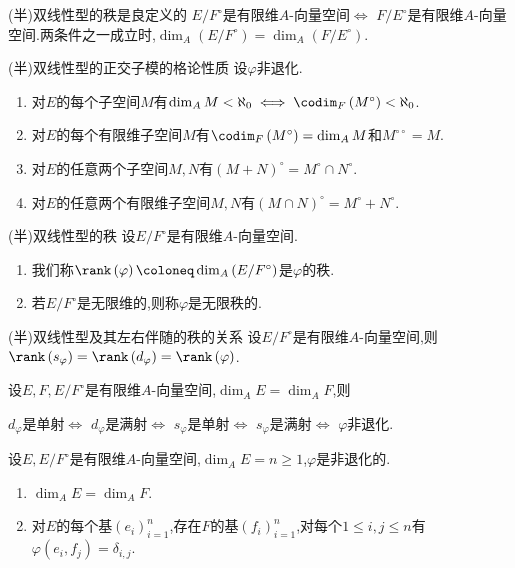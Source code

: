\begin{proposition}{(半)双线性型的秩是良定义的}{}
	$E/F^{\circ}$是有限维$A$-向量空间$\iff$ $F/E^{\circ}$是有限维$A$-向量空间.两条件之一成立时,$\dim_{A}\left(E/F^{\circ}\right)=\dim_{A}\left(F/E^{\circ}\right)$.
\end{proposition}

\begin{corollary}{(半)双线性型的正交子模的格论性质}{}
	设$\varphi$非退化.
	\begin{enumerate}
		\item 对$E$的每个子空间$M$有$\dim_{A}M<\aleph_{0}\iff\codim_{F}\left(M^{\circ}\right)<\aleph_{0}$.
		\item 对$E$的每个有限维子空间$M$有$\codim_{F}\left(M^{\circ}\right)=\dim_{A}M$和$M^{\circ\circ}=M$.
		\item 对$E$的任意两个子空间$M,N$有$\left(M+N\right)^{\circ}=M^{\circ}\cap N^{\circ}$.
		\item 对$E$的任意两个有限维子空间$M,N$有$\left(M\cap N\right)^{\circ}=M^{\circ}+N^{\circ}$.
	\end{enumerate}
\end{corollary}

\begin{definition}{(半)双线性型的秩}{}
	设$E/F^{\circ}$是有限维$A$-向量空间.
	\begin{enumerate}
		\item 我们称$\rank\left(\varphi\right)\coloneq\dim_{A}\left(E/F^{\circ}\right)$是$\varphi$的秩.
		\item 若$E/F^{\circ}$是无限维的,则称$\varphi$是无限秩的.
	\end{enumerate}
\end{definition}

\begin{proposition}{(半)双线性型及其左右伴随的秩的关系}{}
	设$E/F^{\circ}$是有限维$A$-向量空间,则$\rank\left(s_{\varphi}\right)=\rank\left(d_{\varphi}\right)=\rank\left(\varphi\right)$.
\end{proposition}

\begin{proposition}{}{}
	设$E,F,E/F^{\circ}$是有限维$A$-向量空间,$\dim_{A}E=\dim_{A}F$,则
	\begin{center}
		$d_{\varphi}$是单射$\iff$ $d_{\varphi}$是满射$\iff$ $s_{\varphi}$是单射$\iff$ $s_{\varphi}$是满射$\iff$ $\varphi$非退化.
	\end{center}
\end{proposition}

\begin{corollary}{}{}
	设$E,E/F^{\circ}$是有限维$A$-向量空间,$\dim_{A}E=n\geq 1$,$\varphi$是非退化的.
	\begin{enumerate}
		\item $\dim_{A}E=\dim_{A}F$.
		\item 对$E$的每个基$\left(e_{i}\right)_{i=1}^{n}$,存在$F$的基$\left(f_{i}\right)_{i=1}^{n}$,对每个$1\leq i,j\leq n$有$\varphi\left(e_{i},f_{j}\right)=\delta_{i,j}$.
	\end{enumerate}
\end{corollary}


